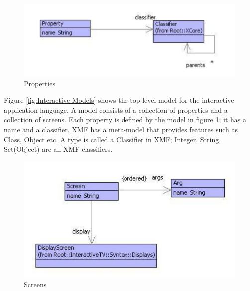 %
\begin{figure}
\begin{center}

\includegraphics[width=12cm]{LanguageEngineering/Interactive/Images/Properties}

\caption{Properties\label{fig:Properties}}

\end{center}
\end{figure}


Figure \ref{fig:Interactive-Models} shows the top-level model for
the interactive application language. A model consists of a collection
of properties and a collection of screens. Each property is defined
by the model in figure \ref{fig:Properties}; it has a name and a
classifier. XMF has a meta-model that provides features such as Class,
Object etc. A type is called a Classifier in XMF; Integer, String,
Set(Object) are all XMF classifiers.

%
\begin{figure}
\begin{center}

\includegraphics[width=12cm]{LanguageEngineering/Interactive/Images/Screen}

\caption{Screens\label{fig:Screens}}

\end{center}
\end{figure}



